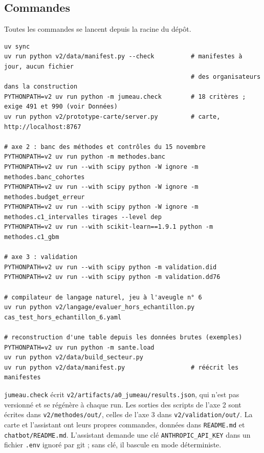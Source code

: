 \subsection{Commandes}
Toutes les commandes se lancent depuis la racine du dépôt.
\begin{small}
\begin{verbatim}
uv sync
uv run python v2/data/manifest.py --check          # manifestes à jour, aucun fichier
                                                   # des organisateurs dans la construction
PYTHONPATH=v2 uv run python -m jumeau.check        # 18 critères ; exige 491 et 990 (voir Données)
uv run python v2/prototype-carte/server.py         # carte, http://localhost:8767

# axe 2 : banc des méthodes et contrôles du 15 novembre
PYTHONPATH=v2 uv run python -m methodes.banc
PYTHONPATH=v2 uv run --with scipy python -W ignore -m methodes.banc_cohortes
PYTHONPATH=v2 uv run --with scipy python -W ignore -m methodes.budget_erreur
PYTHONPATH=v2 uv run --with scipy python -W ignore -m methodes.c1_intervalles tirages --level dep
PYTHONPATH=v2 uv run --with scikit-learn==1.9.1 python -m methodes.c1_gbm

# axe 3 : validation
PYTHONPATH=v2 uv run --with scipy python -m validation.did
PYTHONPATH=v2 uv run --with scipy python -m validation.dd76

# compilateur de langage naturel, jeu à l'aveugle n° 6
uv run python v2/langage/evaluer_hors_echantillon.py cas_test_hors_echantillon_6.yaml

# reconstruction d'une table depuis les données brutes (exemples)
PYTHONPATH=v2 uv run python -m sante.load
uv run python v2/data/build_secteur.py
uv run python v2/data/manifest.py                  # réécrit les manifestes
\end{verbatim}
\end{small}
\texttt{jumeau.check} écrit \texttt{v2/artifacts/a0\_jumeau/results.json}, qui n'est pas versionné et se
régénère à chaque run. Les sorties des scripts de l'axe 2 sont écrites dans \texttt{v2/methodes/out/}, celles de l'axe 3 dans
\texttt{v2/validation/out/}. La carte et l'assistant ont leurs propres commandes, données dans
\texttt{README.md} et \texttt{chatbot/README.md}. L'assistant demande une clé \texttt{ANTHROPIC\_API\_KEY} dans un
fichier \texttt{.env} ignoré par git ; sans clé, il bascule en mode déterministe.

